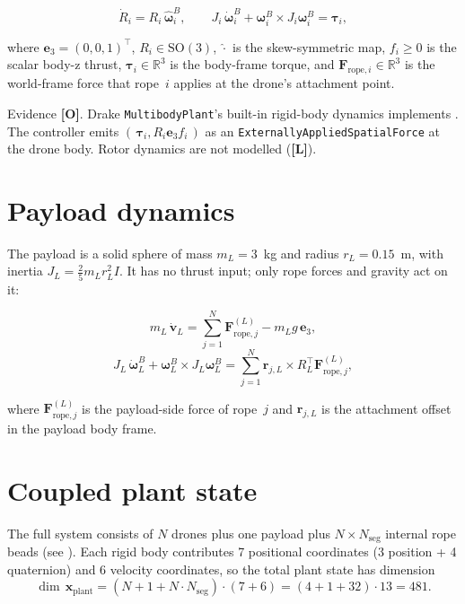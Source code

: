 \documentclass[11pt,a4paper,oneside]{report}
\newcommand{\rope}{\text{rope}}
\newcommand{\bv}{\bm{v}}
\newcommand{\bF}{\bm{F}}
\newcommand{\btau}{\bm{\tau}}
\newcommand{\bomega}{\bm{\omega}}
\newcommand{\be}{\bm{e}}
\newcommand{\R}{\mathbb{R}}
\newcommand{\SO}{\mathrm{SO}}
\newcommand{\Obs}{\textcolor{green!50!black}{\textbf{[O]}}}
\newcommand{\Lim}{\textcolor{red!60!black}{\textbf{[L]}}}
\begin{document}
\begin{equation}
\dot{R}_i = R_i\, \widehat{\bomega}_i^{B}, \qquad
J_i\, \dot{\bomega}_i^{B} + \bomega_i^{B}\times J_i\bomega_i^{B} = \btau_i,
\label{eq:drone-rot}
\end{equation}

where $\be_3=(0,0,1)^\top$, $R_i\in\SO(3)$, $\widehat{\cdot}$ is the
skew-symmetric map, $f_i\ge 0$ is the scalar body-z thrust,
$\btau_i\in\R^3$ is the body-frame torque, and
$\bF_{\rope,i}\in\R^3$ is the world-frame force that rope~$i$ applies
at the drone's attachment point.

\begin{evidence}{Evidence}
\Obs. Drake \texttt{MultibodyPlant}'s built-in rigid-body dynamics
implements . The controller emits
$(\,\btau_i, R_i\be_3 f_i\,)$ as an
\texttt{ExternallyAppliedSpatialForce} at the drone body. Rotor
dynamics are not modelled (\Lim).
\end{evidence}

\section{Payload dynamics}

The payload is a solid sphere of mass $m_L=3$~kg and radius
$r_L=0.15$~m, with inertia $J_L = \frac{2}{5}m_L r_L^2 I$. It has no
thrust input; only rope forces and gravity act on it:

\begin{equation}
m_L\, \dot{\bv}_L = \sum_{j=1}^{N} \bF_{\rope,j}^{(L)} - m_L g\, \be_3,
\label{eq:payload-trans}
\end{equation}
\begin{equation}
J_L\, \dot{\bomega}_L^{B} + \bomega_L^{B}\times J_L\bomega_L^{B}
= \sum_{j=1}^{N} \bm{r}_{j,L}\times R_L^{\!\top}\bF_{\rope,j}^{(L)},
\label{eq:payload-rot}
\end{equation}

where $\bF_{\rope,j}^{(L)}$ is the payload-side force of rope~$j$ and
$\bm{r}_{j,L}$ is the attachment offset in the payload body frame.

\section{Coupled plant state}

The full system consists of $N$ drones plus one payload plus $N\times
N_{\text{seg}}$ internal rope beads (see ). Each
rigid body contributes 7 positional coordinates (3 position + 4
quaternion) and 6 velocity coordinates, so the total plant state has
dimension
\begin{equation}
\dim\,\mathbf{x}_\text{plant}
= (N + 1 + N\cdot N_{\text{seg}})\cdot(7+6) = (4+1+32)\cdot 13 = 481.
\end{equation}
\end{document}

